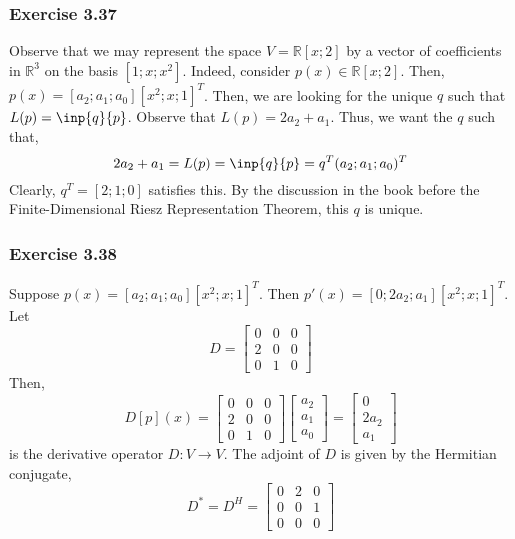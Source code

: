 \documentclass[letterpaper,12pt]{article}
\theoremstyle{definition}
\begin{document}
\subsubsection*{Exercise 3.37}
Observe that we may represent the space $V = \mathbb{R}[x;2]$ by a vector of coefficients in $\mathbb{R}^3$ on the basis $[1; x; x^2]$. Indeed, consider $p(x) \in \mathbb{R}[x;2]$. Then, $p(x) = [a_2; a_1; a_0] [x^2; x; 1]^T$. Then, we are looking for the unique $q$ such that $L(p) = \inp{q}{p}$. Observe that $L(p) = 2a_2 + a_1$. Thus, we want the $q$ such that,
\begin{equation}
	2a_2 + a_1 = L(p) = \inp{q}{p} = q^T (a_2; a_1; a_0)^T
\end{equation}
Clearly, $q^T = [2; 1; 0]$ satisfies this. By the discussion in the book before the Finite-Dimensional Riesz Representation Theorem, this $q$ is unique.

\subsubsection*{Exercise 3.38}
Suppose $p(x) = [a_2; a_1; a_0] [x^2; x; 1]^T$. Then $p'(x) = [0; 2a_2; a_1] [x^2; x; 1]^T$. Let
\begin{equation}
	D = 
	\begin{bmatrix}
	0 & 0 & 0 \\
	2 & 0 & 0 \\
	0 & 1 & 0
	\end{bmatrix}
\end{equation}
Then,
\begin{equation}
	D[p](x) = 
	\begin{bmatrix}
	0 & 0 & 0 \\
	2 & 0 & 0 \\
	0 & 1 & 0
	\end{bmatrix}
	\begin{bmatrix}
	a_2 \\ a_1 \\ a_0
	\end{bmatrix} 
	=
	\begin{bmatrix}
	0 \\ 2a_2 \\ a_1
	\end{bmatrix}
\end{equation}
 is the derivative operator $D : V \to V$. The adjoint of $D$ is given by the Hermitian conjugate,
 \begin{equation}
 D^* = D^H = 
 \begin{bmatrix}
 0 & 2 & 0 \\
 0 & 0 & 1 \\
 0 & 0 & 0
 \end{bmatrix}
 \end{equation}
\end{document}
